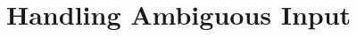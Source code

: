 \chapter{Handling Ambiguous Input}

\newcommand{\rk}[1]{{\color{red}#1}}
\newcommand{\MPJPE}{MPJPE\xspace}
\newcommand{\RE}{RE\xspace}
\newcommand{\SE}{SE\xspace}

\ifpdf
    \graphicspath{{Chapter6/Figs/Raster/}{Chapter6/Figs/PDF/}{Chapter6/Figs/}}
\else
    \graphicspath{{Chapter6/Figs/Vector/}{Chapter6/Figs/}}
\fi







  